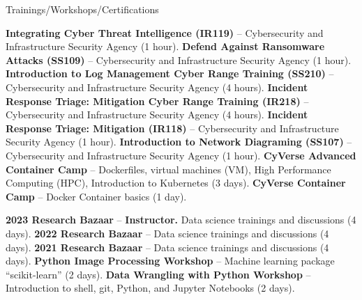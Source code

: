 \begin{rubric}{Trainings/Workshops/Certifications}

\entry*[6/09/2025] \textbf{Integrating Cyber Threat Intelligence (IR119)} -- Cybersecurity and Infrastructure Security Agency (1 hour). \href{https://github.com/amantaya/curriculum-vitae/blob/master/certifications/IR119_CoC_060925%201.pdf}{\scriptsize\faLink}
\entry*[5/28/2025] \textbf{Defend Against Ransomware Attacks (SS109)} -- Cybersecurity and Infrastructure Security Agency (1 hour). \href{https://github.com/amantaya/curriculum-vitae/blob/master/certifications/SS109_MAY28-2025_CertificateofAttendance.pdf}{\scriptsize\faLink}
\entry*[5/22/2025] \textbf{Introduction to Log Management Cyber Range Training (SS210)} -- Cybersecurity and Infrastructure Security Agency (4 hours). \href{https://github.com/amantaya/curriculum-vitae/blob/master/certifications/SS210_May22_2025_Course_Completion_Certificate.pdf}{\scriptsize\faLink}
\entry*[5/15/2025] \textbf{Incident Response Triage: Mitigation Cyber Range Training (IR218)} -- Cybersecurity and Infrastructure Security Agency (4 hours). \href{https://github.com/amantaya/CV/blob/master/certifications/IR218_COA_051525.pdf}{\scriptsize\faLink}
\entry*[5/12/2025] \textbf{Incident Response Triage: Mitigation (IR118)} -- Cybersecurity and Infrastructure Security Agency (1 hour).
\entry*[4/01/2025] \textbf{Introduction to Network Diagraming (SS107)} -- Cybersecurity and Infrastructure Security Agency (1 hour). \href{https://github.com/amantaya/CV/blob/master/certifications/SS107_APR1-2025_CertificateofAttendance.pdf}{\scriptsize\faLink}
\entry*[5/2022] \textbf{CyVerse Advanced Container Camp} -- Dockerfiles, virtual machines (VM), High Performance Computing (HPC), Introduction to Kubernetes (3 days).
\entry*[3/2021] \textbf{CyVerse Container Camp} -- Docker Container basics (1 day).

\entry*[4/2023] \textbf{2023 Research Bazaar} -- \textbf{Instructor.} Data science trainings and discussions (4 days).
\entry*[5/2022] \textbf{2022 Research Bazaar} -- Data science trainings and discussions (4 days).
\entry*[5/2021] \textbf{2021 Research Bazaar} -- Data science trainings and discussions (4 days).
\entry*[2/2020] \textbf{Python Image Processing Workshop} -- Machine learning package “scikit-learn” (2 days).
\entry*[2/2020] \textbf{Data Wrangling with Python Workshop} -- Introduction to shell, git, Python, and Jupyter Notebooks (2 days).


\end{rubric}
